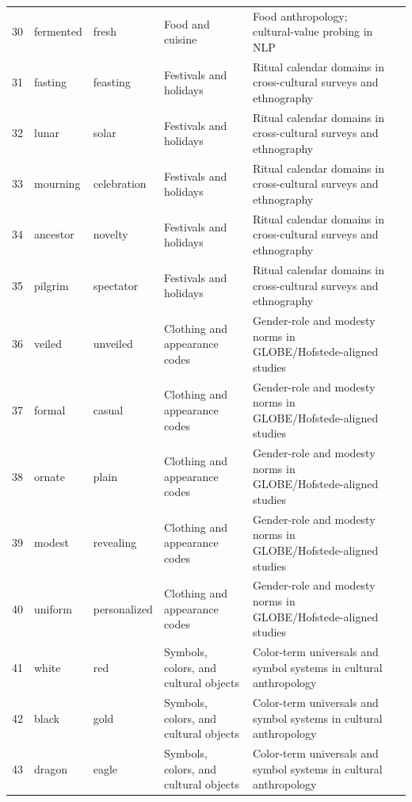 \begin{tabular}{@{}rlllll@{}}
30 & fermented & fresh & Food and cuisine & Food anthropology; cultural-value probing in NLP & \cite{hershcovich2022challenges} \\
31 & fasting & feasting & Festivals and holidays & Ritual calendar domains in cross-cultural surveys and ethnography & \cite{inglehart2005modernization} \\
32 & lunar & solar & Festivals and holidays & Ritual calendar domains in cross-cultural surveys and ethnography & \cite{hershcovich2022challenges} \\
33 & mourning & celebration & Festivals and holidays & Ritual calendar domains in cross-cultural surveys and ethnography & \cite{inglehart2005modernization} \\
34 & ancestor & novelty & Festivals and holidays & Ritual calendar domains in cross-cultural surveys and ethnography & \cite{schwartz2006theory} \\
35 & pilgrim & spectator & Festivals and holidays & Ritual calendar domains in cross-cultural surveys and ethnography & \cite{arora2023probing} \\
36 & veiled & unveiled & Clothing and appearance codes & Gender-role and modesty norms in GLOBE/Hofstede-aligned studies & \cite{house2004culture} \\
37 & formal & casual & Clothing and appearance codes & Gender-role and modesty norms in GLOBE/Hofstede-aligned studies & \cite{hofstede2001culture} \\
38 & ornate & plain & Clothing and appearance codes & Gender-role and modesty norms in GLOBE/Hofstede-aligned studies & \cite{hershcovich2022challenges} \\
39 & modest & revealing & Clothing and appearance codes & Gender-role and modesty norms in GLOBE/Hofstede-aligned studies & \cite{house2004culture} \\
40 & uniform & personalized & Clothing and appearance codes & Gender-role and modesty norms in GLOBE/Hofstede-aligned studies & \cite{hofstede2001culture} \\
41 & white & red & Symbols, colors, and cultural objects & Color-term universals and symbol systems in cultural anthropology & \cite{berlin1969basic} \\
42 & black & gold & Symbols, colors, and cultural objects & Color-term universals and symbol systems in cultural anthropology & \cite{berlin1969basic} \\
43 & dragon & eagle & Symbols, colors, and cultural objects & Color-term universals and symbol systems in cultural anthropology & \cite{hershcovich2022challenges} \\

\end{tabular}
